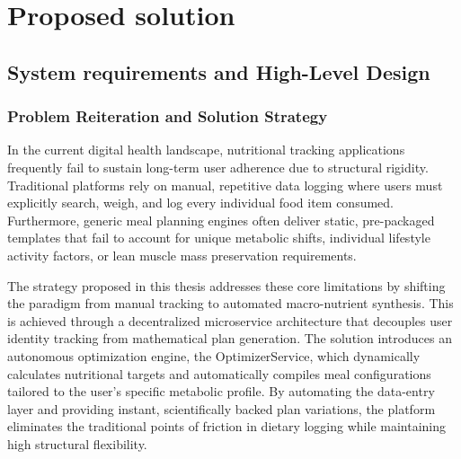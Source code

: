 \chapter{Proposed solution}
\label{cap:cap3}

\section{System requirements and High-Level Design}

\subsection{Problem Reiteration and Solution Strategy}

In the current digital health landscape, nutritional tracking applications frequently fail 
to sustain long-term user adherence due to structural rigidity. Traditional platforms 
rely on manual, repetitive data logging where users must explicitly search, weigh, and 
log every individual food item consumed. Furthermore, generic meal planning engines often 
deliver static, pre-packaged templates that fail to account for unique metabolic shifts, 
individual lifestyle activity factors, or lean muscle mass preservation requirements.

The strategy proposed in this thesis addresses these core limitations by shifting the 
paradigm from manual tracking to automated macro-nutrient synthesis. This is achieved 
through a decentralized microservice architecture that decouples user identity tracking 
from mathematical plan generation. The solution introduces an autonomous optimization 
engine, the OptimizerService, which dynamically calculates nutritional targets and 
automatically compiles meal configurations tailored to the user's specific metabolic 
profile. By automating the data-entry layer and providing instant, scientifically backed 
plan variations, the platform eliminates the traditional points of friction in dietary 
logging while maintaining high structural flexibility.



